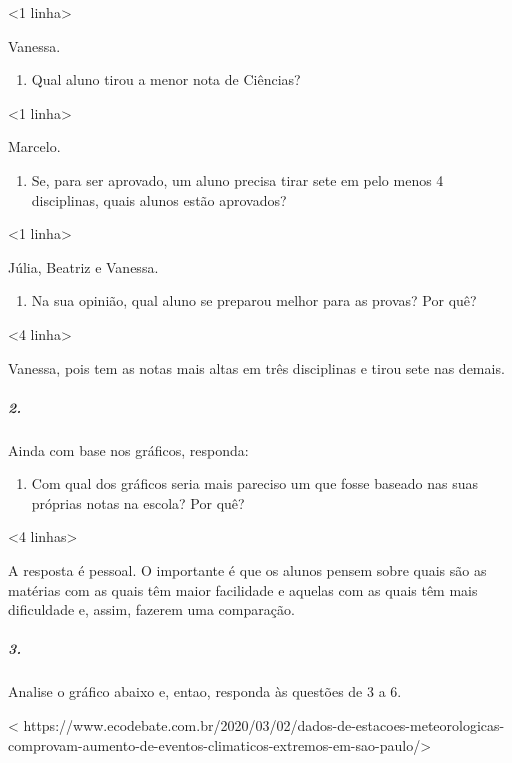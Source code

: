 \textless{}1 linha\textgreater{}

Vanessa.

\begin{enumerate}
\def\labelenumi{\alph{enumi})}
\item
  Qual aluno tirou a menor nota de Ciências?
\end{enumerate}

\textless{}1 linha\textgreater{}

Marcelo.

\begin{enumerate}
\def\labelenumi{\alph{enumi})}
\item
  Se, para ser aprovado, um aluno precisa tirar sete em pelo menos 4
  disciplinas, quais alunos estão aprovados?
\end{enumerate}

\textless{}1 linha\textgreater{}

Júlia, Beatriz e Vanessa.

\begin{enumerate}
\def\labelenumi{\alph{enumi})}
\item
  Na sua opinião, qual aluno se preparou melhor para as provas? Por quê?
\end{enumerate}

\textless{}4 linha\textgreater{}

Vanessa, pois tem as notas mais altas em três disciplinas e tirou sete nas demais.

\subparagraph{2.}\label{section-78}

Ainda com base nos gráficos, responda:

\begin{enumerate}
\def\labelenumi{\alph{enumi})}
\item
  Com qual dos gráficos seria mais pareciso um que fosse baseado nas suas próprias notas na escola? Por quê?
\end{enumerate}

\textless{}4 linhas\textgreater{}

A resposta é pessoal. O importante é que os alunos pensem sobre quais são as matérias com as quais têm maior facilidade e aquelas com as quais têm mais dificuldade e, assim, fazerem uma comparação.

\subparagraph{3.}\label{section-79}

Analise o gráfico abaixo e, entao, responda às questões de 3 a 6.

\textless{}
https://www.ecodebate.com.br/2020/03/02/dados-de-estacoes-meteorologicas-comprovam-aumento-de-eventos-climaticos-extremos-em-sao-paulo/\textgreater{}

